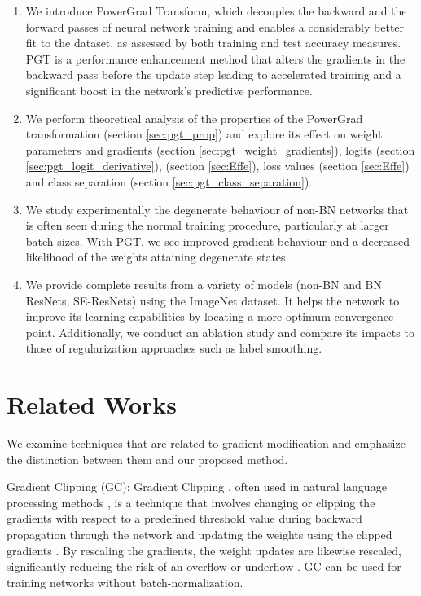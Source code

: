 \documentclass[times,sort&compress]{elsarticle}
\begin{document}
\begin{enumerate}

\item We introduce PowerGrad Transform, which decouples the backward and the forward
passes of neural network training and enables a considerably better fit to the dataset,
as assessed by both training and test accuracy measures. PGT is a performance
enhancement method that alters the gradients in the backward pass before the update step
leading to accelerated training and a significant boost in the network's predictive
performance.

\item We perform theoretical analysis of the properties of the PowerGrad transformation
(section \ref{sec:pgt_prop}) and explore its effect on weight parameters and gradients
(section \ref{sec:pgt_weight_gradients}), logits (section
\ref{sec:pgt_logit_derivative}), (section \ref{sec:Effe}), loss values (section
\ref{sec:Effe}) and class separation (section \ref{sec:pgt_class_separation}).

\item We study experimentally the degenerate behaviour of non-BN networks that is often
seen during the normal training procedure, particularly at larger batch sizes. With PGT,
we see improved gradient behaviour and a decreased likelihood of the weights attaining
degenerate states.

\item We provide complete results from a variety of models (non-BN and BN ResNets,
SE-ResNets) using the ImageNet dataset. It helps the network to improve its learning
capabilities by locating a more optimum convergence point. Additionally, we conduct an
ablation study and compare its impacts to those of regularization approaches such as
label smoothing.

\end{enumerate}






\section{Related Works}
\label{sec:Rela}




We examine techniques that are related to gradient modification and emphasize the
distinction between them and our proposed method.




Gradient Clipping (GC): Gradient Clipping \cite{pascanu2013difficulty}, often used in
natural language processing methods \cite{merity2017regularizing}, is a technique that
involves changing or clipping the gradients with respect to a predefined threshold value
during backward propagation through the network and updating the weights using the
clipped gradients \cite{zhang2019gradient, smith2020generalization}. By rescaling the
gradients, the weight updates are likewise rescaled, significantly reducing the risk of
an overflow or underflow \cite{pascanu2012understanding}. GC can be used for training
networks without batch-normalization.
\end{document}
